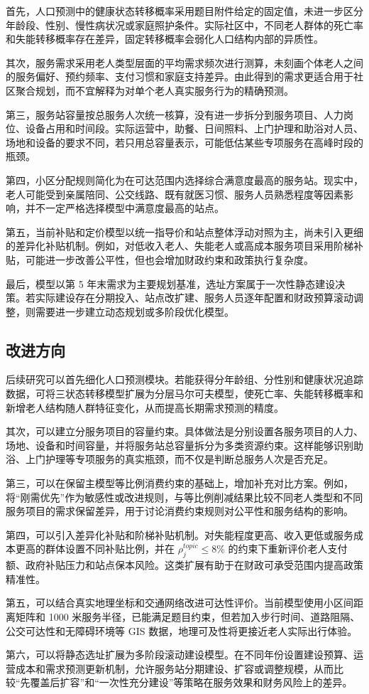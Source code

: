 首先，人口预测中的健康状态转移概率采用题目附件给定的固定值，未进一步区分年龄段、性别、慢性病状况或家庭照护条件。实际社区中，不同老人群体的死亡率和失能转移概率存在差异，固定转移概率会弱化人口结构内部的异质性。

其次，服务需求采用老人类型层面的平均需求频次进行测算，未刻画个体老人之间的服务偏好、预约频率、支付习惯和家庭支持差异。由此得到的需求更适合用于社区聚合规划，而不宜解释为对单个老人真实服务行为的精确预测。

第三，服务站容量按总服务人次统一核算，没有进一步拆分到服务项目、人力岗位、设备占用和时间段。实际运营中，助餐、日间照料、上门护理和助浴对人员、场地和设备的要求不同，若只用总容量表示，可能低估某些专项服务在高峰时段的瓶颈。

第四，小区分配规则简化为在可达范围内选择综合满意度最高的服务站。现实中，老人可能受到亲属陪同、公交线路、既有就医习惯、服务人员熟悉程度等因素影响，并不一定严格选择模型中满意度最高的站点。

第五，当前补贴和定价模型以统一指导价和站点整体浮动对照为主，尚未引入更细的差异化补贴机制。例如，对低收入老人、失能老人或高成本服务项目采用阶梯补贴，可能进一步改善公平性，但也会增加财政约束和政策执行复杂度。

最后，模型以第 5 年末需求为主要规划基准，选址方案属于一次性静态建设决策。若实际建设存在分期投入、站点改扩建、服务人员逐年配置和财政预算滚动调整，则需要进一步建立动态规划或多阶段优化模型。

\subsection{改进方向}

后续研究可以首先细化人口预测模块。若能获得分年龄组、分性别和健康状况追踪数据，可将三状态转移模型扩展为分层马尔可夫模型，使死亡率、失能转移概率和新增老人结构随人群特征变化，从而提高长期需求预测的精度。

其次，可以建立分服务项目的容量约束。具体做法是分别设置各服务项目的人力、场地、设备和时间容量，并将服务站总容量拆分为多类资源约束。这样能够识别助浴、上门护理等专项服务的真实瓶颈，而不仅是判断总服务人次是否充足。

第三，可以在保留主模型等比例消费约束的基础上，增加补充对比方案。例如，将“刚需优先”作为敏感性或改进规则，与等比例削减结果比较不同老人类型和不同服务项目的需求保留差异，用于讨论消费约束规则对公平性和服务结构的影响。

第四，可以引入差异化补贴和阶梯补贴机制。对失能程度更高、收入更低或服务成本更高的群体设置不同补贴比例，并在 $\rho_j^{topic}\le8\%$ 的约束下重新评价老人支付额、政府补贴压力和站点保本风险。这类扩展有助于在财政可承受范围内提高政策精准性。

第五，可以结合真实地理坐标和交通网络改进可达性评价。当前模型使用小区间距离矩阵和 1000 米服务半径，已能满足题目约束，但若加入步行时间、道路阻隔、公交可达性和无障碍环境等 GIS 数据，地理可及性将更接近老人实际出行体验。

第六，可以将静态选址扩展为多阶段滚动建设模型。在不同年份设置建设预算、运营成本和需求预测更新机制，允许服务站分期建设、扩容或调整规模，从而比较“先覆盖后扩容”和“一次性充分建设”等策略在服务效果和财务风险上的差异。

